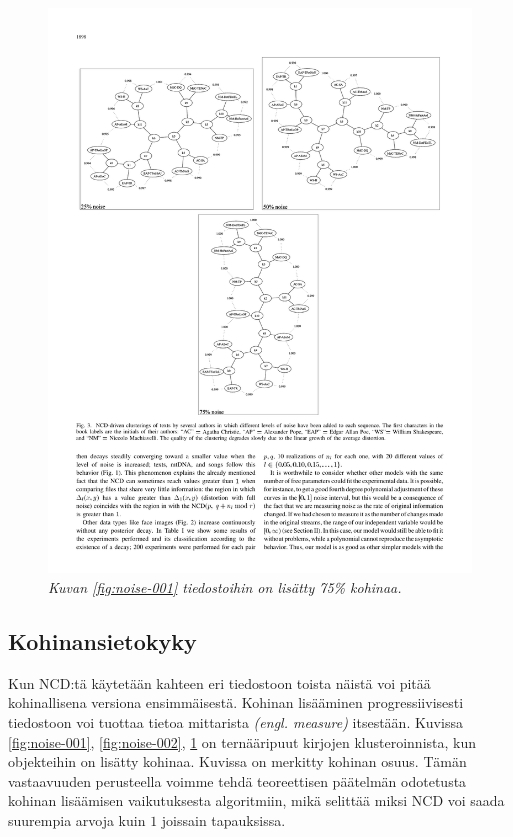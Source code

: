 \documentclass[12pt,finnish,final]{tktltiki2}
\theoremstyle{definition}
\theoremstyle{remark}
\newcommand{\engl}[1]{\emph{(engl. #1)}}
\begin{document}
    \begin{figure}[tb]
      \immediate{}
      \includegraphics{img/noise-003}
      \caption{\emph{Kuvan \ref{fig:noise-001} tiedostoihin on lisätty 75\% kohinaa.}
      \cite{4167725}}
      \label{fig:noise-003}
    \end{figure}
  \subsection{Kohinansietokyky} %
  \label{sub:kohinansietokyky}

    Kun NCD:tä käytetään kahteen eri tiedostoon toista näistä voi pitää kohinallisena versiona ensimmäisestä.
    Kohinan lisääminen progressiivisesti tiedostoon voi tuottaa tietoa mittarista \engl{measure} itsestään.
    Kuvissa \ref{fig:noise-001}, \ref{fig:noise-002}, \ref{fig:noise-003} on ternääripuut kirjojen klusteroinnista, kun objekteihin on lisätty kohinaa. Kuvissa on merkitty kohinan osuus.
    Tämän vastaavuuden perusteella voimme tehdä teoreettisen päätelmän odotetusta kohinan lisäämisen vaikutuksesta algoritmiin, mikä selittää miksi NCD voi saada suurempia arvoja kuin $1$ joissain tapauksissa. \cite{4167725}
\end{document}
